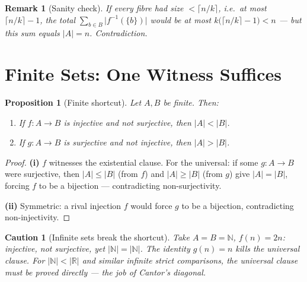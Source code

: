 \documentclass[11pt]{article}
\theoremstyle{defstyle}
\theoremstyle{thmstyle}
\newtheorem{proposition}[theorem]{Proposition}
\theoremstyle{notstyle}
\newtheorem*{remark}{Remark}
\theoremstyle{cautionstyle}
\newtheorem*{caution}{Caution}
\newcommand{\N}{\mathbb{N}}
\newcommand{\R}{\mathbb{R}}
\newcommand{\card}[1]{\lvert #1 \rvert}
\newcommand{\fib}[1]{f^{-1}(\{#1\})}
\begin{document}
\begin{notebox}
\begin{remark}[Sanity check]
If every fibre had size $< \lceil n/k \rceil$, i.e.\ at most
$\lceil n/k \rceil - 1$, the total $\sum_{b \in B} \card{\fib{b}}$ would be at
most $k\bigl(\lceil n/k \rceil - 1\bigr) < n$ --- but this sum equals
$\card{A} = n$. Contradiction.
\end{remark}
\end{notebox}

\section{Finite Sets: One Witness Suffices}

\begin{thmbox}
\begin{proposition}[Finite shortcut]
Let $A, B$ be finite. Then:
\begin{enumerate}[label=\textnormal{(\roman*)}, leftmargin=2em, itemsep=2pt]
  \item If $f : A \to B$ is injective and not surjective, then $\card{A} < \card{B}$.
  \item If $g : A \to B$ is surjective and not injective, then $\card{A} > \card{B}$.
\end{enumerate}
\end{proposition}
\end{thmbox}

\begin{proof}
\textbf{(i)} $f$ witnesses the existential clause. For the universal: if some
$g : A \to B$ were surjective, then $\card{A} \leq \card{B}$ (from $f$) and
$\card{A} \geq \card{B}$ (from $g$) give $\card{A} = \card{B}$, forcing $f$ to
be a bijection --- contradicting non-surjectivity.

\smallskip
\textbf{(ii)} Symmetric: a rival injection $f$ would force $g$ to be a
bijection, contradicting non-injectivity.
\end{proof}

\begin{cautionbox}
\begin{caution}[Infinite sets break the shortcut]
Take $A = B = \N$, $f(n) = 2n$: injective, not surjective, yet
$\card{\N} = \card{\N}$. The identity $g(n) = n$ kills the universal clause.
For $\card{\N} < \card{\R}$ and similar infinite strict comparisons, the
universal clause must be proved directly --- the job of Cantor's diagonal.
\end{caution}
\end{cautionbox}
\end{document}
